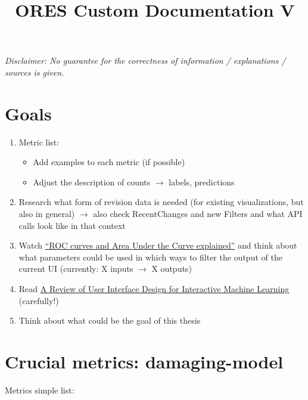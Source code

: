 \documentclass[12pt,a4paper]{article}
\title{ORES Custom Documentation V}
\date{}
\begin{document}
\maketitle
\textit{Disclaimer: No guarantee for the correctness of information / explanations / sources is given.}\\
%
\section*{Goals}
\begin{enumerate}
\item Metric list:
\begin{itemize}
\item Add examples to each metric (if possible)
\item Adjust the description of counts $\rightarrow$ labels, predictions
\end{itemize}
\item Research what form of revision data is needed (for existing visualizations, but also in general) $\rightarrow$ also check RecentChanges and new Filters and what API calls look like in that context
\item Watch \href{https://www.dataschool.io/roc-curves-and-auc-explained}{``ROC curves and Area Under the Curve explained''} and think about what parameters could be used in which ways to filter the output of the current UI (currently: X inputs $\rightarrow$ X outputs)
\item Read \href{https://doi.org/10.1145/3185517}{A Review of User Interface Design for Interactive Machine Learning} (carefully!)
\item Think about what could be the goal of this thesis
\end{enumerate}
%
%
%
\newpage
\section{Crucial metrics: \textbf{damaging}-model}
Metrics simple list:\\
\end{document}
